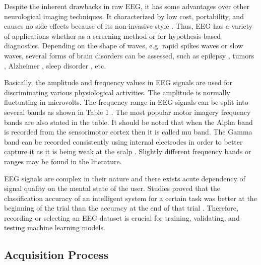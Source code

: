 \documentclass[journal,twocolumn]{IEEEtran}
\begin{document}
Despite the inherent drawbacks in raw EEG, it has some advantages over other neurological imaging techniques. It characterized by low cost, portability, and causes no side effects because of its non-invasive style \cite{qiao2019deep}. Thus, EEG has a variety of applications whether as a screening method or for hypothesis-based diagnostics. Depending on the shape of waves, e.g. rapid spikes waves or slow waves, several forms of brain disorders can be assessed, such as epilepsy \cite{mardini2020enhanced}, tumors \cite{mardini2020enhanced}, Alzheimer \cite{pandya2020buildout}, sleep disorder \cite{geng2020novel}, etc.

Basically, the amplitude and frequency values in EEG signals are used for discriminating various physiological activities. The amplitude is normally fluctuating in microvolts. The frequency range in EEG signals can be split into several bands as shown in Table 1 \cite{wang2018lstm}. The most popular motor imagery frequency bands are also stated in the table. It should be noted that when the Alpha band is recorded from the sensorimotor cortex then it is called mu band. The Gamma band can be recorded consistently using internal electrodes in order to better capture it as it is being weak at the scalp \cite{padfield2019eeg}. Slightly different frequency bands or ranges may be found in the literature.

EEG signals are complex in their nature and there exists acute dependency of signal quality on the mental state of the user. Studies proved that the classification accuracy of an intelligent system for a certain task was better at the beginning of the trial than the accuracy at the end of that trial \cite{padfield2019eeg}. Therefore, recording or selecting an EEG dataset is crucial for training, validating, and testing machine learning models.

\subsection{Acquisition Process}
\end{document}
